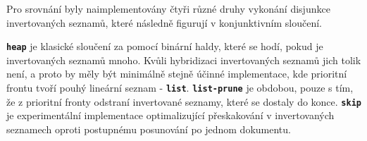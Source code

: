 \documentclass[11pt,letterpaper,oneside,openright]{book}
\newcommand{\bftt}[1]{\texttt{\textbf{#1}}}
\begin{document}
Pro srovnání byly naimplementovány čtyři různé druhy vykonání disjunkce
invertovaných seznamů, které následně figurují v konjunktivním sloučení.

\bftt{heap} je klasické sloučení za pomocí binární haldy, které se hodí, pokud
je invertovaných seznamů mnoho. Kvůli hybridizaci invertovaných seznamů jich
tolik není, a proto by měly být minimálně stejně účinné implementace, kde
prioritní frontu tvoří pouhý lineární seznam - \bftt{list}. \bftt{list-prune}
je obdobou, pouze s tím, že z prioritní fronty odstraní invertované seznamy,
které se dostaly do konce. \bftt{skip} je experimentální implementace
optimalizující přeskakování v invertovaných seznamech oproti postupnému
posunování po jednom dokumentu.

\end{document}
